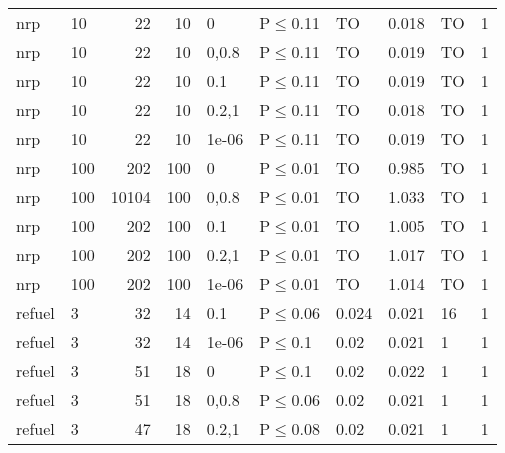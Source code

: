 \begin{longtable}{llrrllllll}
 nrp           & 10        &     	22 &   10 & 0     & P$\leq$0.11  & TO      & 0.018   & TO      & 1    \\
 nrp           & 10        &     	22 &   10 & 0,0.8 & P$\leq$0.11  & TO      & 0.019   & TO      & 1    \\
 nrp           & 10        &     	22 &   10 & 0.1   & P$\leq$0.11  & TO      & 0.019   & TO      & 1    \\
 nrp           & 10        &     	22 &   10 & 0.2,1 & P$\leq$0.11  & TO      & 0.018   & TO      & 1    \\
 nrp           & 10        &     	22 &   10 & 1e-06 & P$\leq$0.11  & TO      & 0.019   & TO      & 1    \\
 nrp           & 100       &    	202 &  100 & 0     & P$\leq$0.01  & TO      & 0.985   & TO      & 1    \\
 nrp           & 100       &  	10104 &  100 & 0,0.8 & P$\leq$0.01  & TO      & 1.033   & TO      & 1    \\
 nrp           & 100       &    	202 &  100 & 0.1   & P$\leq$0.01  & TO      & 1.005   & TO      & 1    \\
 nrp           & 100       &    	202 &  100 & 0.2,1 & P$\leq$0.01  & TO      & 1.017   & TO      & 1    \\
 nrp           & 100       &    	202 &  100 & 1e-06 & P$\leq$0.01  & TO      & 1.014   & TO      & 1    \\
 refuel        & 3         &     	32 &   14 & 0.1   & P$\leq$0.06  & 0.024   & 0.021   & 16      & 1    \\
 refuel        & 3         &     	32 &   14 & 1e-06 & P$\leq$0.1   & 0.02    & 0.021   & 1       & 1    \\
 refuel        & 3         &     	51 &   18 & 0     & P$\leq$0.1   & 0.02    & 0.022   & 1       & 1    \\
 refuel        & 3         &     	51 &   18 & 0,0.8 & P$\leq$0.06  & 0.02    & 0.021   & 1       & 1    \\
 refuel        & 3         &     	47 &   18 & 0.2,1 & P$\leq$0.08  & 0.02    & 0.021   & 1       & 1    \\
\bottomrule
\end{longtable}
